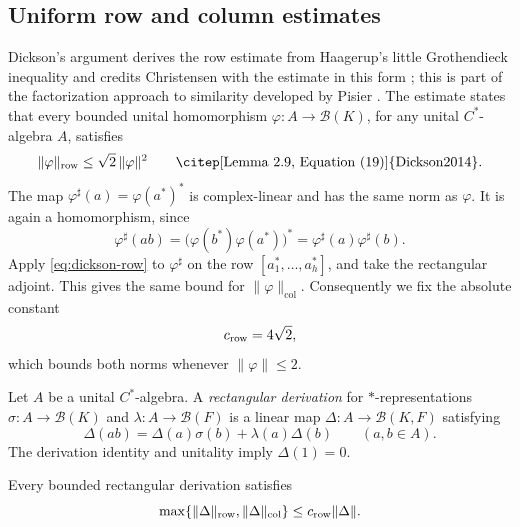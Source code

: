 \subsection{Uniform row and column estimates}

Dickson's argument derives the row estimate from Haagerup's little
Grothendieck inequality and credits Christensen with the estimate in
this form \citep[Lemmas~2.8--2.9]{Dickson2014}; this is part of the
factorization approach to similarity developed by Pisier
\citep{Pisier1999Degree,Pisier2001Remarks}.
The estimate states that every bounded unital homomorphism
\(\varphi:A\to\mathcal B(K)\), for any unital \(C^*\)-algebra \(A\),
satisfies
\begin{equation}
 \|\varphi\|_{\mathrm{row}}
       \le\sqrt2\,\|\varphi\|^2
 \qquad\text{\citep[Lemma~2.9, Equation~(19)]{Dickson2014}}.
 \label{eq:dickson-row}
\end{equation}
The map \(\varphi^\sharp(a)=\varphi(a^*)^*\) is complex-linear and has
the same norm as \(\varphi\). It is again a homomorphism, since
\[
 \varphi^\sharp(ab)
 =\bigl(\varphi(b^*)\varphi(a^*)\bigr)^*
 =\varphi^\sharp(a)\varphi^\sharp(b).
\]
Apply \eqref{eq:dickson-row} to \(\varphi^\sharp\) on the row
\([a_1^*,\ldots,a_h^*]\), and take the rectangular adjoint. This gives
the same bound for \(\|\varphi\|_{\mathrm{col}}\). Consequently we fix
the absolute constant
\begin{equation}
 c_{\rm row}=4\sqrt2,
 \label{eq:row-constant}
\end{equation}
which bounds both norms whenever \(\|\varphi\|\le2\).

Let \(A\) be a unital \(C^*\)-algebra. A \emph{rectangular derivation}
for \(*\)-representations
\(\sigma:A\to\mathcal B(K)\) and
\(\lambda:A\to\mathcal B(F)\) is a linear map
\(\Delta:A\to\mathcal B(K,F)\) satisfying
\begin{equation}
 \Delta(ab)=\Delta(a)\sigma(b)+\lambda(a)\Delta(b)
 \qquad(a,b\in A).
 \label{eq:rectangular-derivation}
\end{equation}
The derivation identity and unitality imply \(\Delta(1)=0\).

\begin{lemma}
\label{lem:row-column}
Every bounded rectangular derivation satisfies
\begin{equation}
 \max\{\|\Delta\|_{\mathrm{row}},\|\Delta\|_{\mathrm{col}}\}
       \le c_{\rm row}\|\Delta\|.
 \label{eq:rectangular-row-column}
\end{equation}
\end{lemma}

